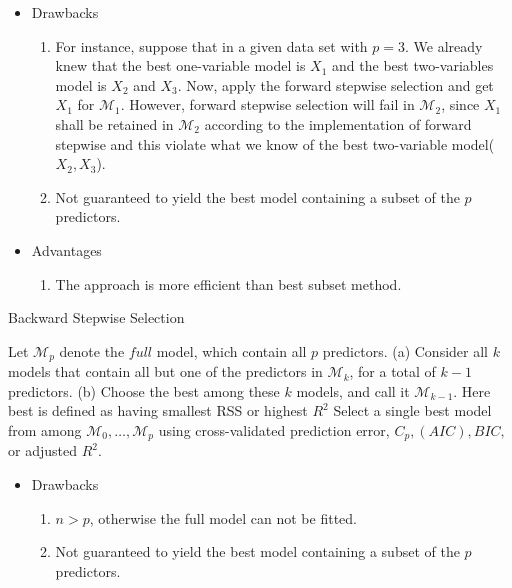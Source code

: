 \documentclass[12pt,a4paper]{article}%
\theoremstyle{definition}
\theoremstyle{plain}
\numberwithin{equation}{section}
\newcounter{subsubsubsection}[subsubsection]
\begin{document}
\begin{itemize}
\item Drawbacks
\begin{enumerate}
	\item For instance, suppose that in a given data set with $p=3$. We already knew that the best one-variable model is $X_{1}$ and the best two-variables model is $X_{2}$ and $X_{3}$. Now, apply the forward stepwise selection and get $X_{1}$ for $\mathcal{M}_{1}$. However, forward stepwise selection will fail in $\mathcal{M}_{2}$, since $X_{1}$ shall be retained in $\mathcal{M}_{2}$ according to the implementation of forward stepwise and this violate what we know of the best two-variable model($X_{2},X_{3}$).
	\item Not guaranteed to yield the best model containing a subset of the $p$ predictors.
\end{enumerate}
\end{itemize}

\begin{itemize}
\item Advantages
\begin{enumerate}
	\item The approach is more efficient than best subset method.
\end{enumerate}
\end{itemize}

\begin{algorithm}[H]
\caption{Backward Stepwise Selection}\label{backward-stepwise}
\begin{algorithmic}[1]
\State Let $\mathcal{M}_{p}$ denote the $full$ model, which contain all $p$ predictors. 
\State (a) Consider all $k$ models that contain all but one of the predictors in $\mathcal{M}_{k}$, for a total of $k-1$ predictors.
\State (b) Choose the best among these $k$ models, and call it $\mathcal{M}_{k-1}$. Here best is defined as having smallest RSS or highest $R^{2}$
\EndFor
\State Select a single best model from among $\mathcal{M}_{0},\dots,\mathcal{M}_{p}$ using cross-validated prediction error, $C_{p},(AIC),BIC,$ or adjusted $R^{2}$.
\end{algorithmic}
\end{algorithm}

\begin{itemize}
\item Drawbacks
\begin{enumerate}
	\item $n>p$, otherwise the full model can not be fitted.
	\item Not guaranteed to yield the best model containing a subset of the $p$ predictors.
\end{enumerate}
\end{itemize}
\end{document}
